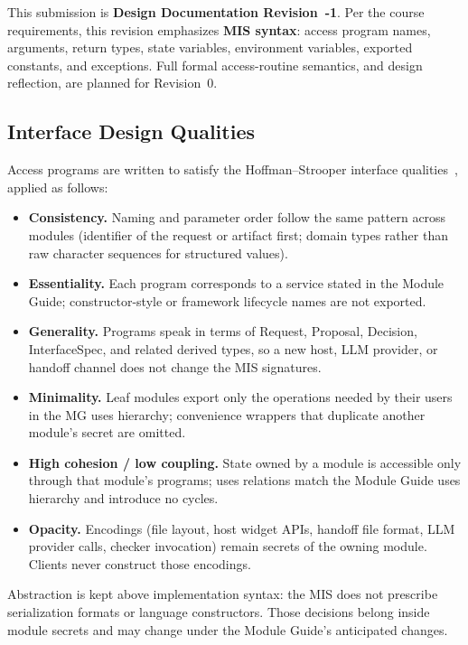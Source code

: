 \documentclass[12pt, titlepage]{article}
\begin{document}
This submission is \textbf{Design Documentation Revision~-1}. Per the course
requirements, this revision emphasizes \textbf{MIS syntax}: access program
names, arguments, return types, state variables, environment variables, exported
constants, and exceptions. Full formal access-routine semantics, and design
reflection, are planned for Revision~0.

\subsection{Interface Design Qualities}

Access programs are written to satisfy the Hoffman--Strooper interface
qualities~\citep{HoffmanAndStrooper1995}, applied as follows:

\begin{itemize}
  \item \textbf{Consistency.} Naming and parameter order follow the same pattern
    across modules (identifier of the request or artifact first; domain types
    rather than raw character sequences for structured values).
  \item \textbf{Essentiality.} Each program corresponds to a service stated in
    the Module Guide; constructor-style or framework lifecycle names are not
    exported.
  \item \textbf{Generality.} Programs speak in terms of Request, Proposal,
    Decision, InterfaceSpec, and related derived types, so a new host, LLM
    provider, or handoff channel does not change the MIS signatures.
  \item \textbf{Minimality.} Leaf modules export only the operations needed by
    their users in the MG uses hierarchy; convenience wrappers that duplicate
    another module's secret are omitted.
  \item \textbf{High cohesion / low coupling.} State owned by a module is
    accessible only through that module's programs; uses relations match
    the Module Guide uses hierarchy and introduce no cycles.
  \item \textbf{Opacity.} Encodings (file layout, host widget APIs, handoff
    file format, LLM provider calls, checker invocation) remain secrets of the
    owning module. Clients never construct those encodings.
\end{itemize}

Abstraction is kept above implementation syntax: the MIS does not prescribe
serialization formats or language constructors. Those decisions belong inside
module secrets and may change under the Module Guide's anticipated changes.
\end{document}

